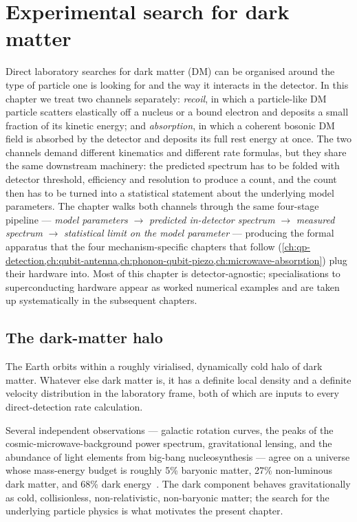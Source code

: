 \chapter{Experimental search for dark matter}
\label{ch:dm-search}

Direct laboratory searches for dark matter (DM) can be organised around
the type of particle one is looking for and the way it interacts in
the detector. In this chapter we treat two channels separately:
\emph{recoil}, in which a particle-like DM particle scatters elastically
off a nucleus or a bound electron and deposits a small fraction of
its kinetic energy; and \emph{absorption}, in which a coherent
bosonic DM field is absorbed by the detector and deposits its full
rest energy at once. The two channels demand different kinematics
and different rate formulas, but they share the same downstream
machinery: the predicted spectrum has to be folded with detector
threshold, efficiency and resolution to produce a count, and the
count then has to be turned into a statistical statement about the
underlying model parameters. The chapter walks both channels through
the same four-stage pipeline --- \emph{model parameters} $\to$
\emph{predicted in-detector spectrum} $\to$ \emph{measured spectrum}
$\to$ \emph{statistical limit on the model parameter} --- producing
the formal apparatus that the four mechanism-specific chapters
that follow
(\cref{ch:qp-detection,ch:qubit-antenna,ch:phonon-qubit-piezo,ch:microwave-absorption})
plug their hardware into. Most of this chapter is detector-agnostic;
specialisations to superconducting hardware appear as worked
numerical examples and are taken up systematically in the
subsequent chapters.

\section{The dark-matter halo}
\label{sec:dm-halo}

\begin{phenomenon}
The Earth orbits within a roughly virialised, dynamically cold halo
of dark matter. Whatever else dark matter is, it has a definite
local density and a definite velocity distribution in the
laboratory frame, both of which are inputs to every direct-detection
rate calculation.
\end{phenomenon}

Several independent observations --- galactic rotation curves, the
peaks of the cosmic-microwave-background power spectrum,
gravitational lensing, and the abundance of light elements from
big-bang nucleosynthesis --- agree on a universe whose mass-energy
budget is roughly 5\% baryonic matter, 27\% non-luminous dark
matter, and 68\% dark energy~\cite{bertone2005}. The dark
component behaves gravitationally as cold, collisionless,
non-relativistic, non-baryonic matter; the search for the underlying
particle physics is what motivates the present chapter.

